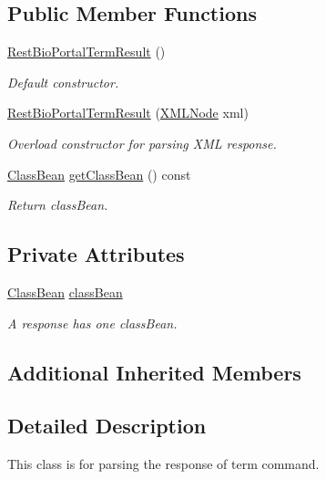 \subsection*{Public Member Functions}
\begin{DoxyCompactItemize}
\item 
\hyperlink{classunisys_1_1RestBioPortalTermResult_a5d9423f8c6829ea1a7d325d98cf325a3}{Rest\-Bio\-Portal\-Term\-Result} ()
\begin{DoxyCompactList}\small\item\em Default constructor. \end{DoxyCompactList}\item 
\hyperlink{classunisys_1_1RestBioPortalTermResult_adfa7c483d28e7245d0e44a34cfa3e185}{Rest\-Bio\-Portal\-Term\-Result} (\hyperlink{structXMLNode}{X\-M\-L\-Node} xml)
\begin{DoxyCompactList}\small\item\em Overload constructor for parsing X\-M\-L response. \end{DoxyCompactList}\item 
\hyperlink{classunisys_1_1ClassBean}{Class\-Bean} \hyperlink{classunisys_1_1RestBioPortalTermResult_a575449d6572aa2a4ce07d8bdba48a1c2}{get\-Class\-Bean} () const 
\begin{DoxyCompactList}\small\item\em Return class\-Bean. \end{DoxyCompactList}\end{DoxyCompactItemize}
\subsection*{Private Attributes}
\begin{DoxyCompactItemize}
\item 
\hyperlink{classunisys_1_1ClassBean}{Class\-Bean} \hyperlink{classunisys_1_1RestBioPortalTermResult_afb40985ec0ba628ecf5684f5aa4b192a}{class\-Bean}
\begin{DoxyCompactList}\small\item\em A response has one class\-Bean. \end{DoxyCompactList}\end{DoxyCompactItemize}
\subsection*{Additional Inherited Members}


\subsection{Detailed Description}
This class is for parsing the response of term command. 

